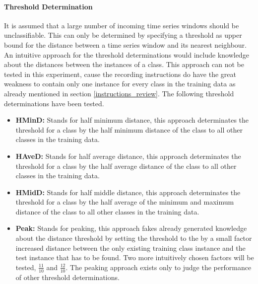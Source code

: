 \paragraph{Threshold Determination} \label{threshold_determination}
It is assumed that a large number of incoming time series windows should be unclassifiable. This can only be determined
by specifying a threshold as upper bound for the distance between a time series window and its nearest neighbour. An
intuitive approach for the threshold determinations would include knowledge about the distances between the instances of
a class. This approach can not be tested in this experiment, cause the recording instructions do have the great weakness
to contain only one instance for every class in the training data as already mentioned in section
\ref{instructions_review}. The following threshold determinations have been tested.

\begin{itemize}
    \item \textbf{HMinD:} Stands for half minimum distance, this approach determinates the threshold for a class by the
        half minimum distance of the class to all other classes in the training data.
    \item \textbf{HAveD:} Stands for half average distance, this approach determinates the threshold for a class by the
        half average distance of the class to all other classes in the training data.
    \item \textbf{HMidD:} Stands for half middle distance, this approach determinates the threshold for a class by the
        half average of the minimum and maximum distance of the class to all other classes in the training data.
    \item \textbf{Peak:} Stands for peaking, this approach fakes already generated knowledge about the distance
        threshold by setting the threshold to the by a small factor increased distance between the only existing
        training class instance and the test instance that has to be found. Two more intuitively chosen factors will be
        tested, $\frac{11}{10}$ and $\frac{12}{10}$. The peaking approach exists only to judge the performance of other
        threshold determinations.
\end{itemize}
